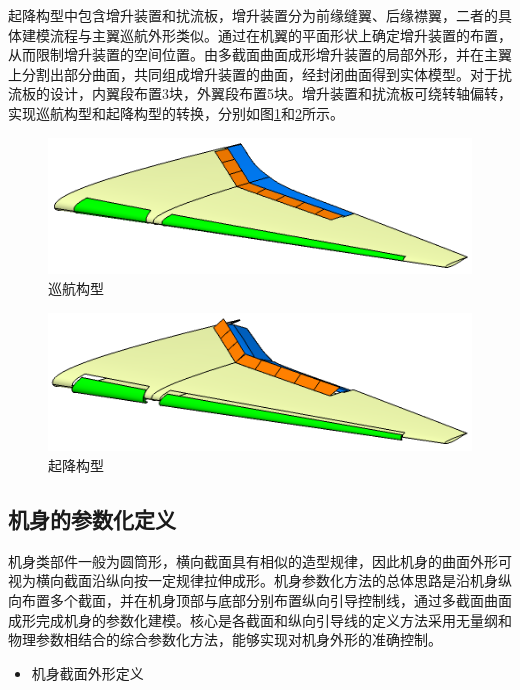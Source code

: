 \documentclass[12pt,a4paper]{report}
\begin{document}
起降构型中包含增升装置和扰流板，增升装置分为前缘缝翼、后缘襟翼，二者的具体建模流程与主翼巡航外形类似。通过在机翼的平面形状上确定增升装置的布置，从而限制增升装置的空间位置。由多截面曲面成形增升装置的局部外形，并在主翼上分割出部分曲面，共同组成增升装置的曲面，经封闭曲面得到实体模型。对于扰流板的设计，内翼段布置3块，外翼段布置5块。增升装置和扰流板可绕转轴偏转，实现巡航构型和起降构型的转换，分别如图\ref{fig:WingCruise}和\ref{fig:WingTL}所示。

\begin{figure}[hbt!]
\centering
\includegraphics[width=.8\textwidth]{HiLiftCruise.PNG}
\caption{巡航构型}
\label{fig:WingCruise}
\end{figure}

\begin{figure}[hbt!]
\centering
\includegraphics[width=.8\textwidth]{HiLiftTL.PNG}
\caption{起降构型}
\label{fig:WingTL}
\end{figure}

\subsection{机身的参数化定义}

机身类部件一般为圆筒形，横向截面具有相似的造型规律，因此机身的曲面外形可视为横向截面沿纵向按一定规律拉伸成形。机身参数化方法的总体思路是沿机身纵向布置多个截面，并在机身顶部与底部分别布置纵向引导控制线，通过多截面曲面成形完成机身的参数化建模。核心是各截面和纵向引导线的定义方法采用无量纲和物理参数相结合的综合参数化方法，能够实现对机身外形的准确控制。

\begin{itemize}
    \item[(1)] 机身截面外形定义
\end{itemize}
\end{document}
